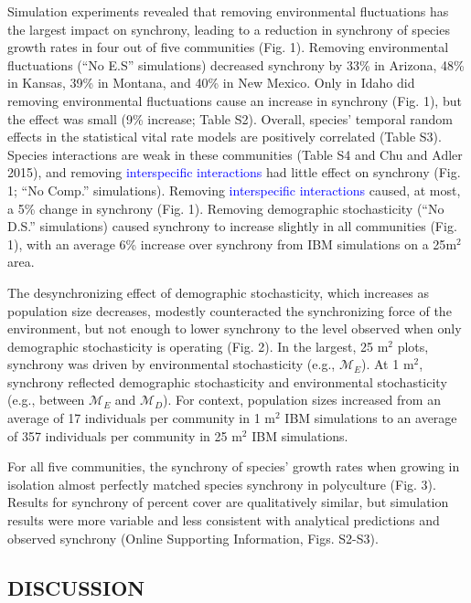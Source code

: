 \documentclass[12pt,]{article}
\begin{document}
Simulation experiments revealed that removing environmental fluctuations
has the largest impact on synchrony, leading to a reduction in synchrony
of species growth rates in four out of five communities (Fig. 1).
Removing environmental fluctuations (``No E.S'' simulations) decreased
synchrony by 33\% in Arizona, 48\% in Kansas, 39\% in Montana, and 40\%
in New Mexico. Only in Idaho did removing environmental fluctuations
cause an increase in synchrony (Fig. 1), but the effect was small (9\%
increase; Table S2). Overall, species' temporal random effects in the
statistical vital rate models are positively correlated (Table S3).
Species interactions are weak in these communities (Table S4 and Chu and
Adler 2015), and removing \textcolor{blue}{interspecific interactions}
had little effect on synchrony (Fig. 1; ``No Comp.'' simulations).
Removing \textcolor{blue}{interspecific interactions} caused, at most, a
5\% change in synchrony (Fig. 1). Removing demographic stochasticity
(``No D.S.'' simulations) caused synchrony to increase slightly in all
communities (Fig. 1), with an average 6\% increase over synchrony from
IBM simulations on a 25\(\text{m}^2\) area.

The desynchronizing effect of demographic stochasticity, which increases
as population size decreases, modestly counteracted the synchronizing
force of the environment, but not enough to lower synchrony to the level
observed when only demographic stochasticity is operating (Fig. 2). In
the largest, 25 \(\text{m}^2\) plots, synchrony was driven by
environmental stochasticity (e.g., \(\mathcal{M}_E\)). At 1
\(\text{m}^2\), synchrony reflected demographic stochasticity and
environmental stochasticity (e.g., between \(\mathcal{M}_E\) and
\(\mathcal{M}_D\)). For context, population sizes increased from an
average of 17 individuals per community in 1 \(\text{m}^2\) IBM
simulations to an average of 357 individuals per community in 25
\(\text{m}^2\) IBM simulations.

For all five communities, the synchrony of species' growth rates when
growing in isolation almost perfectly matched species synchrony in
polyculture (Fig. 3). Results for synchrony of percent cover are
qualitatively similar, but simulation results were more variable and
less consistent with analytical predictions and observed synchrony
(Online Supporting Information, Figs. S2-S3).

\subsection{DISCUSSION}\label{discussion}
\end{document}
